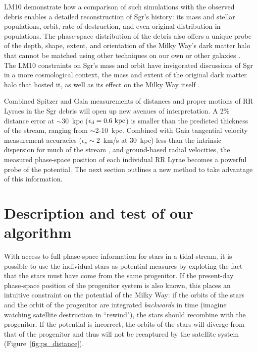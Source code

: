 \documentclass[preprint]{aastex}
\begin{document}
LM10 demonstrate how a comparison of such simulations with the
observed debris enables a detailed reconstruction of Sgr's history:
its mass and stellar populations, orbit, rate of destruction, and even
original distribution in populations. The phase-space distribution of
the debris also offers a unique probe of the depth, shape, extent, and
orientation of the Milky Way's dark matter halo that cannot be matched
using other techniques on our own or other galaxies
\citep[e.g.,][]{ibata01}. The LM10 constraints on Sgr's mass and orbit
have invigorated discussions of Sgr in a more cosmological context,
the mass and extent of the original dark matter halo that hosted it,
as well as its effect on the Milky Way itself
\citep{bailin03,purcell11,micheldansac11,gomez12}.

Combined Spitzer and Gaia measurements of distances and proper motions
of RR Lyraes in the Sgr debris will open up new avenues of
interpretation. A 2\% distance error at $\sim$30~kpc
($\epsilon_{d}=0.6~{\rm kpc}$) is smaller than the predicted thickness
of the stream, ranging from $\sim$2-$10$~kpc. Combined with Gaia
tangential velocity measurement accuracies ($\epsilon_{v}\sim2$~km/s
at 30~kpc) less than the intrinsic dispersion for much of the stream
\citep[$\sigma_v\sim10$~km/s;][]{majewski04}, and ground-based radial
velocities, the measured phase-space position of each individual RR
Lyrae becomes a powerful probe of the potential. The next section
outlines a new method to take advantage of this information.

\section{Description and test of our algorithm}
\label{sec:method}
With access to full phase-space information for stars in a tidal
stream, it is possible to use the individual stars as potential
measures by exploting the fact that the stars must have come from the
same progenitor. If the present-day phase-space position of the
progenitor system is also known, this places an intuitive constraint
on the potential of the Milky Way: if the orbits of the stars and the
orbit of the progenitor are integrated \emph{backwards} in time
(imagine watching satellite destruction in ``rewind"), the stars
should recombine with the progenitor. If the potential is incorrect,
the orbits of the stars will diverge from that of the progenitor and
thus will not be recaptured by the satellite system
(Figure~\ref{fig:ps_distance}).
\end{document}
